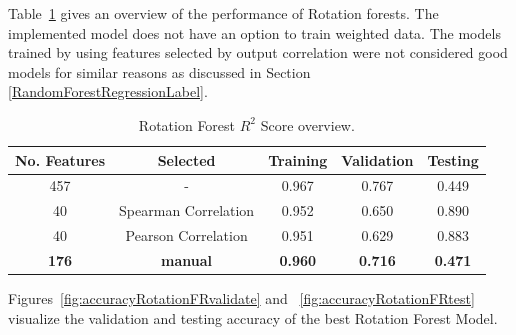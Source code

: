 \documentclass[11pt]{article}
\begin{document}
Table~\ref{table:4} gives an overview of the performance of Rotation forests.
The implemented model does not have an option to train weighted data.
The models trained by using features selected by output correlation were not considered good models for similar reasons as discussed in Section \ref{RandomForestRegressionLabel}.

\begin{table} [h!]
\centering
\resizebox{\linewidth}{!} {
 \begin{tabular}{ | c | c | c | c | c | }
\hline
\textbf{No.  Features} & \textbf{Selected} & \textbf{Training} & \textbf{Validation} & \textbf{Testing} \\ [0.5 ex]
\hline \hline
457 & - & 0.967 & 0.767 & 0.449\\
40 & Spearman Correlation & 0.952 & 0.650 & 0.890\\
40 & Pearson Correlation & 0.951 & 0.629 & 0.883 \\
\textbf{176} & \textbf{manual} & \textbf{0.960} & \textbf{0.716} & \textbf{0.471} \\ [1ex]
\hline
\end{tabular}
}
\caption{Rotation Forest $R^2$ Score overview.}
\label {table:4}
\end{table}

Figures~\ref{fig:accuracyRotationFRvalidate} and ~\ref{fig:accuracyRotationFRtest} visualize the validation and testing accuracy of the best Rotation Forest Model.
\end{document}
